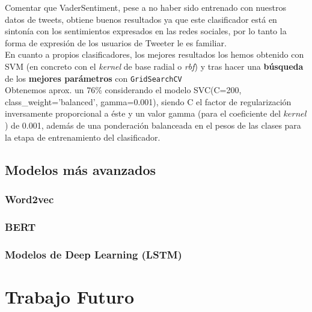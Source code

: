 \documentclass[a4paper,12pt]{report}
\begin{document}
Comentar que VaderSentiment, pese a no haber sido entrenado con nuestros datos de tweets, obtiene buenos resultados ya que este clasificador está en sintonía con los sentimientos expresados en las redes sociales, por lo tanto la forma de expresión de los usuarios de Tweeter le es familiar.
\vspace{2mm}\\
En cuanto a propios clasificadores, los mejores resultados los hemos obtenido con SVM (en concreto con el \textit{kernel} de base radial o \textit{rbf}) y tras hacer una \textbf{búsqueda} de los \textbf{mejores parámetros} con \texttt{GridSearchCV} 
\vspace{2mm}\\
Obtenemos aprox. un 76\% considerando el modelo SVC(C=200, class\_weight='balanced', gamma=0.001), siendo C el factor de regularización inversamente proporcional a éste y un valor gamma  (para el coeficiente del $kernel$) de 0.001, además de una ponderación balanceada en el pesos de las clases para la etapa de entrenamiento del clasificador.


\clearpage

\section{Modelos más avanzados}

\subsection{Word2vec}
\subsection{BERT}
\subsection{Modelos de Deep Learning (LSTM)}




\chapter{Trabajo Futuro}
\end{document}
